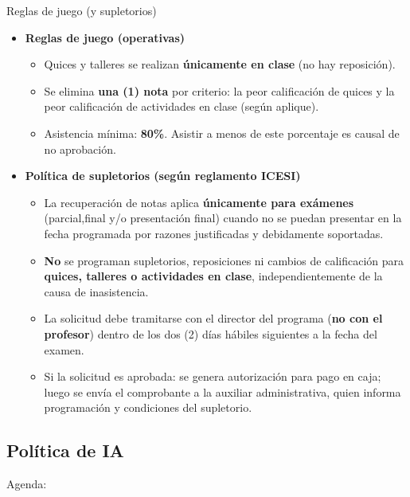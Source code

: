 \documentclass[10pt, xcolor=dvipsnames]{beamer}
\begin{document}
\begin{frame}{Reglas de juego (y supletorios)}
\small
\begin{itemize}
  \item \textbf{Reglas de juego (operativas)}
  \begin{itemize}
    \item Quices y talleres se realizan \textbf{únicamente en clase} (no hay reposición).
    \item Se elimina \textbf{una (1) nota} por criterio: la peor calificación de quices y la peor calificación de actividades en clase (según aplique).
    \item Asistencia mínima: \textbf{80\%}. Asistir a menos de este porcentaje es causal de no aprobación.
  \end{itemize} \vspace{0.2cm}

  \item \textbf{Política de supletorios (según reglamento ICESI)}
  \begin{itemize}
    \item La recuperación de notas aplica \textbf{únicamente para exámenes} (parcial,final y/o presentación final) cuando no se puedan presentar en la fecha programada por razones justificadas y debidamente soportadas.
    \item \textbf{No} se programan supletorios, reposiciones ni cambios de calificación para \textbf{quices, talleres o actividades en clase}, independientemente de la causa de inasistencia.
    \item La solicitud debe tramitarse con el director del programa (\textbf{no con el profesor}) dentro de los dos (2) días hábiles siguientes a la fecha del examen.
    \item Si la solicitud es aprobada: se genera autorización para pago en caja; luego se envía el comprobante a la auxiliar administrativa, quien informa programación y condiciones del supletorio.
  \end{itemize}
\end{itemize}
\end{frame}


\subsection{Política de IA}
\begin{frame}[noframenumbering]{Agenda:}
\end{frame}
\end{document}
